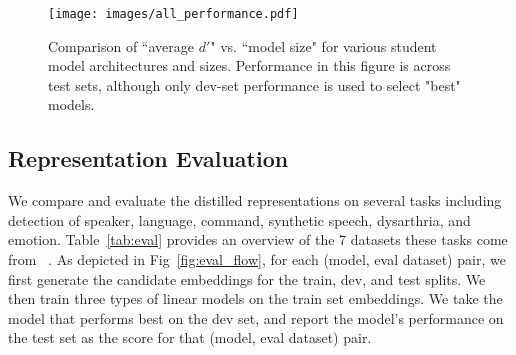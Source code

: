 \begin{figure*}[t]
{\centering
  \texttt{[image: images/all\_performance.pdf]}\hspace{0.2cm}
  \caption{Comparison of ``average $d'$" vs. ``model size" for various student model architectures and sizes. Performance in this figure is across test sets, although only dev-set performance is used to select "best" models.}\label{fig:performance}}
\end{figure*}
\vspace{-3mm}
\subsection{Representation Evaluation}
\label{subsec:eval}

We compare and evaluate the distilled representations on several tasks including detection of speaker, language, command, synthetic speech, dysarthria, and emotion. Table~\ref{tab:eval} provides an overview of the 7 datasets these tasks come from ~\cite{trill, cap12, asremb}.
As depicted in Fig~\ref{fig:eval_flow}, for each (model, eval dataset) pair, we first generate the candidate embeddings for the train, dev, and test splits. We then train three types of linear models on the train set embeddings. We take the model that performs best on the dev set, and report the model's performance on the test set as the score for that (model, eval dataset) pair. %

